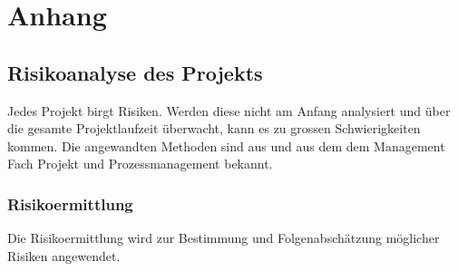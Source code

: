 %
%

\chapter{Anhang}\label{chap.anhang}

\section{Risikoanalyse des Projekts}\label{risikoanalyse}
Jedes Projekt birgt Risiken. Werden diese nicht am Anfang analysiert und über die gesamte Projektlaufzeit überwacht, kann es zu grossen Schwierigkeiten kommen. Die angewandten Methoden sind aus \cite{proj_mgmt_book} und aus dem dem Management Fach Projekt und Prozessmanagement bekannt.

\subsection{Risikoermittlung}\label{risikoermittlung}
Die Risikoermittlung wird zur Bestimmung und Folgenabschätzung möglicher Risiken angewendet.

